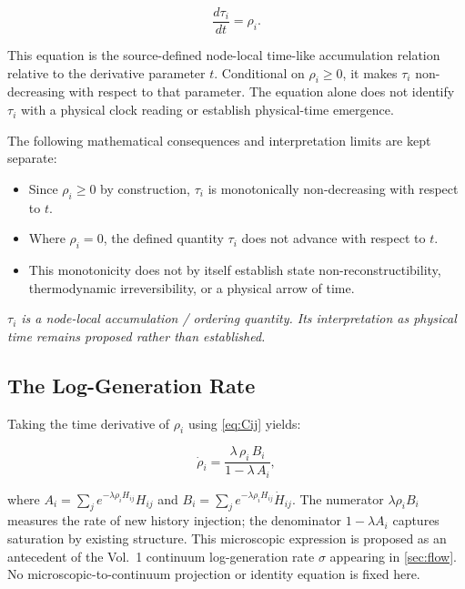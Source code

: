 \begin{keybox}
\begin{equation}
  \frac{d\tau_i}{dt} = \rho_i.
  \label{eq:tau}
\end{equation}
\end{keybox}

This equation is the source-defined node-local time-like accumulation
relation relative to the derivative parameter $t$. Conditional on
$\rho_i\geq0$, it makes $\tau_i$ non-decreasing with respect to that
parameter. The equation alone does not identify $\tau_i$ with a physical
clock reading or establish physical-time emergence.

\noindent
The following mathematical consequences and interpretation limits are kept
separate:

\begin{itemize}
  \item Since $\rho_i \geq 0$ by construction, $\tau_i$ is monotonically
    non-decreasing with respect to $t$.
  \item Where $\rho_i = 0$, the defined quantity $\tau_i$ does not advance
    with respect to $t$.
  \item This monotonicity does not by itself establish state
    non-reconstructibility, thermodynamic irreversibility, or a physical arrow
    of time.
\end{itemize}

\begin{keybox}
\textit{$\tau_i$ is a node-local accumulation / ordering quantity.
Its interpretation as physical time remains proposed rather than established.}
\end{keybox}

\subsection{The Log-Generation Rate}

Taking the time derivative of $\rho_i$ using \cref{eq:Cij} yields:

\begin{equation}
  \dot{\rho}_i = \frac{\lambda\,\rho_i\,B_i}{1 - \lambda\,A_i},
  \label{eq:rhodot}
\end{equation}

where $A_i = \sum_j e^{-\lambda\rho_i H_{ij}} H_{ij}$
and $B_i = \sum_j e^{-\lambda\rho_i H_{ij}} \dot{H}_{ij}$.
The numerator $\lambda\rho_i B_i$ measures the rate of new history injection;
the denominator $1 - \lambda A_i$ captures saturation by existing structure.
This microscopic expression is proposed as an antecedent of the Vol.~1
continuum log-generation rate $\sigma$ appearing in \cref{sec:flow}.
No microscopic-to-continuum projection or identity equation is fixed here.
